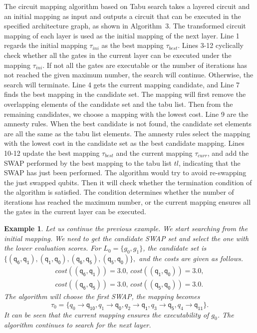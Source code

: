 \documentclass[journal]{IEEEtran}
\newtheorem{example}{Example}
\begin{document}
	The circuit mapping algorithm based on Tabu search takes a layered circuit and an initial mapping as input and outputs a circuit that can be executed in the specified architecture graph, as shown in Algorithm~3. %
	The transformed circuit mapping of each layer is used as the initial mapping of the next layer. 
	Line 1 regards the initial mapping $\tau_{ini}$ as the best mapping $\tau_{best}$. Lines 3-12 cyclically check whether all the gates in the current layer can be executed under the mapping $\tau_{ini}$. If not all the gates are executable or the number of iterations has not reached the given maximum number, the search will continue. Otherwise, the search will terminate. Line 4 gets the current mapping candidate, and Line 7 finds the best mapping in the candidate set. The mapping will first remove the overlapping elements of the candidate set and the tabu list. Then from the remaining candidates, we choose a mapping with the lowest cost. Line 9 are the amnesty rules. When the best candidate is not found, the candidate set elements are all the same as the tabu list elements. The amnesty rules select the mapping with the lowest cost in the candidate set as the best candidate mapping. Lines 10-12 update the best mapping $\tau_{best}$ and the current mapping $\tau_{curr}$, and add the SWAP performed by the best mapping to the tabu list $tl$, indicating that the SWAP has just been performed. 
	The algorithm would try to avoid re-swapping the just swapped qubits. Then it will check whether the termination condition of the algorithm is satisfied. The condition determines whether the number of iterations has reached the maximum number, or the current mapping ensures all the gates in the current layer can be executed. 
\begin{example}
Let us continue the previous example. We start searching from the initial mapping. We need to get the candidate SWAP set and select the one with the lower evaluation scores.
For $L_{0}=\{g_{0},g_{1}\}$, the candidate set is 
$\{(\textsf{q}_\textsf{6},\textsf{q}_\textsf{1}), (\textsf{q}_\textsf{1},\textsf{q}_\textsf{0}), (\textsf{q}_\textsf{6},\textsf{q}_\textsf{5}), (\textsf{q}_\textsf{5},\textsf{q}_\textsf{0}) \} , $ and the costs are given as follows.
\[\begin{array}{l}
cost((\textsf{q}_\textsf{6},\textsf{q}_\textsf{1}))=3.0, \, cost((\textsf{q}_\textsf{1},\textsf{q}_\textsf{0}))=3.0,\\ cost((\textsf{q}_\textsf{6},\textsf{q}_\textsf{5}))=3.0, \, cost((\textsf{q}_\textsf{5},\textsf{q}_\textsf{0}))=3.0 .
\end{array}\]
The algorithm will choose the first SWAP, the mapping becomes $$\tau_{0}=\{\textit{q}_\textit{0}\rightarrow  \textsf{q}_\textsf{10},\textit{q}_\textit{1}\rightarrow  \textsf{q}_\textsf{0},
\textit{q}_\textit{2}\rightarrow  \textsf{q}_\textsf{1},\textit{q}_\textit{3}\rightarrow  \textsf{q}_\textsf{5},\textit{q}_\textit{4}\rightarrow  \textsf{q}_\textsf{11}\} . $$ 
 It can be seen that the current mapping ensures the executability of $g_{0}$. The algorithm continues to search for the next layer.
\end{example}
\end{document}
